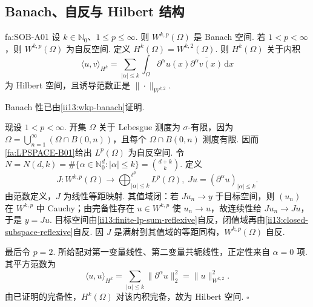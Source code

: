 \subsection{Banach、自反与 Hilbert 结构}

\begin{FATheorem}{fa:SOB-A01}
设 \(\displaystyle k\in\mathbb N_0\)、\(\displaystyle1\leqslant p\leqslant\infty\). 则 \(\displaystyle W^{k,p}(\Omega)\) 是 Banach 空间. 若 \(\displaystyle1<p<\infty\)，则 \(\displaystyle W^{k,p}(\Omega)\) 为自反空间. 定义 \(\displaystyle H^k(\Omega)=W^{k,2}(\Omega).\)
则 \(\displaystyle H^k(\Omega)\) 关于内积
\[
\langle u,v\rangle_{H^k}
=
\sum_{|\alpha|\leqslant k}
\int_\Omega
\partial^\alpha u(x)
\overline{\partial^\alpha v(x)}
\,\mathrm{d}x
\]
为 Hilbert 空间，且诱导范数正是 \(\displaystyle\|\cdot\|_{W^{k,2}}\).
\end{FATheorem}

\begin{FAProof}
Banach 性已由\autoref{ii13:wkp-banach}证明.

现设 \(\displaystyle1<p<\infty\). 开集 \(\displaystyle\Omega\) 关于 Lebesgue 测度为 \(\displaystyle\sigma\)-有限，因为 \(\displaystyle \Omega=\bigcup_{n=1}^\infty(\Omega\cap B(0,n))\)，且每个 \(\displaystyle\Omega\cap B(0,n)\) 测度有限. 因而\autoref{fa:LPSPACE-B01}给出 \(\displaystyle L^p(\Omega)\) 为自反空间. 令 \(\displaystyle N=N(d,k) = \#\{\alpha\in\mathbb N_0^d:|\alpha|\leqslant k\} = \binom{d+k}{k}.\)
定义
\[
J:W^{k,p}(\Omega)
\longrightarrow
\bigoplus_{|\alpha|\leqslant k}^{\ell^p}L^p(\Omega),
\;
Ju=(\partial^\alpha u)_{|\alpha|\leqslant k}.
\]
由范数定义，\(\displaystyle J\) 为线性等距映射. 其值域闭：若 \(\displaystyle Ju_n\to y\) 于目标空间，则 \(\displaystyle(u_n)\) 在 \(\displaystyle W^{k,p}\) 中 Cauchy；由完备性存在 \(\displaystyle u\in W^{k,p}\) 使 \(\displaystyle u_n\to u\)，故连续性给 \(\displaystyle Ju_n\to Ju\)，于是 \(\displaystyle y=Ju\). 目标空间由\autoref{ii13:finite-lp-sum-reflexive}自反，闭值域再由\autoref{ii13:closed-subspace-reflexive}自反. 因 \(\displaystyle J\) 是满射到其值域的等距同构，\(\displaystyle W^{k,p}(\Omega)\) 自反.

最后令 \(\displaystyle p=2\). 所给配对第一变量线性、第二变量共轭线性，正定性来自 \(\displaystyle\alpha=0\) 项. 其平方范数为
\[
\langle u,u\rangle_{H^k}
=
\sum_{|\alpha|\leqslant k}\|\partial^\alpha u\|_2^2
=
\|u\|_{W^{k,2}}^2.
\]
由已证明的完备性，\(\displaystyle H^k(\Omega)\) 对该内积完备，故为 Hilbert 空间.
\hfill\(\square\)
\end{FAProof}

